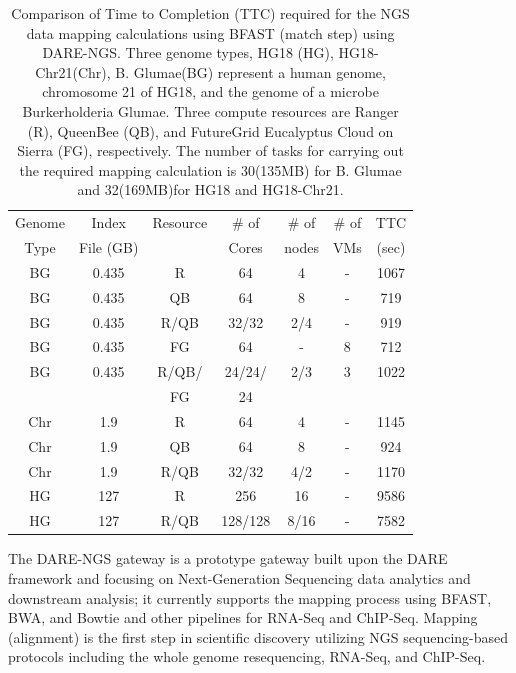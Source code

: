 \documentclass[]{svjour3}
\begin{document}
\begin{table}
\centering
\scriptsize
 \begin{tabular}{|c|c|c|c|c|c|c|} 
 \hline 
Genome & Index         & Resource    & \# of & \# of &   \# of         &	TTC  \\
  Type               & File (GB)        & &Cores &   nodes &  VMs&  (sec)\\  
  \hline
 BG &0.435& R&	64 &4&-	&1067 \\
\hline                  
BG &0.435& QB	&	64& 8&-	&719 \\
\hline
 BG &0.435&R/QB	&	32/32 &2/4& -&919 \\
\hline
 BG &0.435& FG &	64 &-&8	&712 \\
\hline
 BG &0.435 &  R/QB/ &	24/24/& 2/3 & 3 &1022\\
 & & FG& 24 &&&\\
\hline
\hline
Chr &1.9& R	&	64& 4 &-&1145 \\
\hline
Chr &1.9& QB	&	64&8&-	&924 \\
\hline
Chr &1.9& R/QB	&	32/32& 4/2&	-&1170 \\
\hline
\hline
HG &127& R	&	256 & 16 &-	&9586\\
\hline
HG &127& R/QB	&	128/128&8/16 & -&7582 \\
\hline
\end{tabular}
\caption{
  Comparison of Time to Completion (TTC) required for the NGS data
  mapping calculations using BFAST (match step) using DARE-NGS. 
  Three genome types,
  HG18 (HG), HG18-Chr21(Chr), B. Glumae(BG) represent a human genome,
  chromosome 21 of HG18, and the genome of a microbe Burkerholderia
  Glumae. Three compute resources are Ranger (R), QueenBee (QB), and
  FutureGrid  Eucalyptus Cloud on Sierra (FG), respectively. The
  number of tasks for carrying out the required mapping calculation is
  30(135MB) for B. Glumae and 32(169MB)for HG18 and HG18-Chr21.
}

  \label{table:NGS-Distributed} 
\end{table}

The DARE-NGS gateway %
is a prototype gateway built upon the DARE framework and focusing on
Next-Generation Sequencing data analytics and downstream analysis; it
currently supports the mapping process using BFAST, BWA, and Bowtie
and other pipelines for RNA-Seq and
ChIP-Seq\cite{mardis2008-arghg,ecmls_ccpe10}. Mapping (alignment) is
the first step in scientific discovery utilizing NGS sequencing-based
protocols including the whole genome resequencing, RNA-Seq, and
ChIP-Seq.
\end{document}
